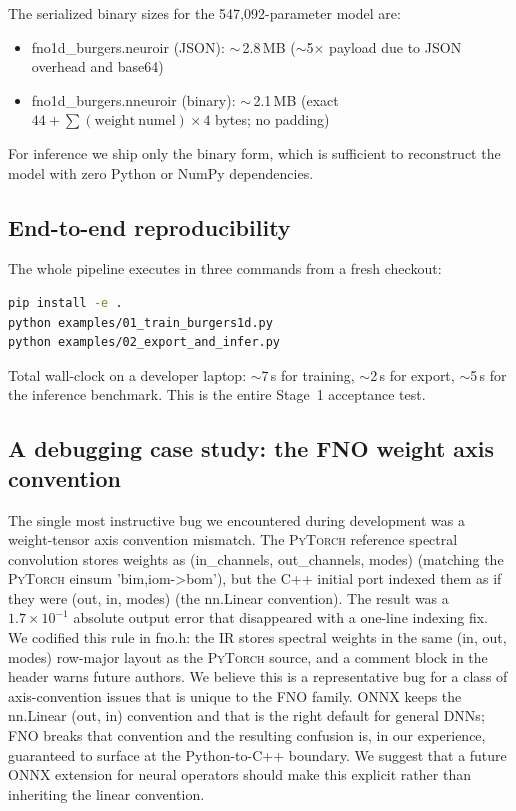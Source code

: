 \documentclass[10pt,twocolumn]{article}
\renewcommand{\texttt}[1]{{\normalfont\ttfamily #1}\normalfont\rmfamily}
\newcommand{\py}{\textsc{PyTorch}}
\begin{document}
The serialized binary sizes for the 547{,}092-parameter model
are:
\begin{itemize}[leftmargin=*,itemsep=1pt,topsep=2pt]
  \item \texttt{fno1d\_burgers.neuroir} (JSON):
    $\sim$\,2.8\,MB ($\sim$5$\times$ payload due to JSON
    overhead and base64)
  \item \texttt{fno1d\_burgers.nneuroir} (binary):
    $\sim$\,2.1\,MB (exact $44 + \sum (\mathrm{weight\ numel})
    \times 4$ bytes; no padding)
\end{itemize}
%
For inference we ship only the binary form, which is sufficient
to reconstruct the model with zero Python or NumPy dependencies.

\subsection{End-to-end reproducibility}

The whole pipeline executes in three commands from a fresh
checkout:
\begin{lstlisting}[language=bash,basicstyle=\ttfamily\footnotesize,
  numbers=none,frame=none]
pip install -e .
python examples/01_train_burgers1d.py
python examples/02_export_and_infer.py
\end{lstlisting}
%
Total wall-clock on a developer laptop: $\sim$7\,s for training,
$\sim$2\,s for export, $\sim$5\,s for the inference benchmark.
This is the entire Stage~1 acceptance test.

\subsection{A debugging case study: the FNO weight axis convention}

The single most instructive bug we encountered during development
was a weight-tensor axis convention mismatch.  The \py{}
reference spectral convolution stores weights as
\texttt{(in\_channels, out\_channels, modes)} (matching the
\py{} einsum \texttt{'bim,iom->bom'}), but the C{++} initial port
indexed them as if they were \texttt{(out, in, modes)} (the
\texttt{nn.Linear} convention).  The result was a $1.7 \times
10^{-1}$ absolute output error that disappeared with a one-line
indexing fix.  We codified this rule in \texttt{fno.h}: the IR
stores spectral weights in the same \texttt{(in, out, modes)}
row-major layout as the \py{} source, and a comment block in
the header warns future authors.
%
We believe this is a representative bug for a class of
axis-convention issues that is unique to the FNO family.  ONNX
keeps the \texttt{nn.Linear} \texttt{(out, in)} convention and
that is the right default for general DNNs; FNO breaks that
convention and the resulting confusion is, in our experience,
guaranteed to surface at the Python-to-C{++} boundary.  We
suggest that a future ONNX extension for neural operators should
make this explicit rather than inheriting the linear convention.
\end{document}
